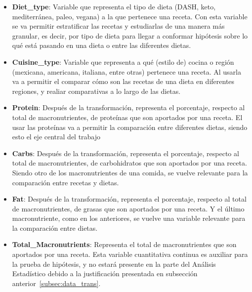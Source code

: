 \documentclass[12pt,a4paper]{article}
\begin{document}
        \begin{itemize}[label=\textbullet]

            \item \textbf{Diet\_type}: Variable que representa el tipo de 
            dieta (DASH, keto, mediterránea, paleo, vegana) a la que 
            pertenece una receta. Con esta variable se va permitir estratificar 
            las recetas y estudiarlas de una manera más granular, es decir, 
            por tipo de dieta para llegar a conformar hipótesis sobre lo qué 
            está pasando en una dieta o entre las diferentes dietas.

            \item \textbf{Cuisine\_type}: Variable que representa a qué (estilo 
            de) cocina o región (mexicana, americana, italiana, entre otras) pertenece una 
            receta. Al usarla va a permitir el comparar cómo son las recetas 
            de una dieta en diferentes regiones, y realiar comparativas a lo 
            largo de las dietas.

            \item \textbf{Protein}: Después de la transformación, representa el 
            porcentaje, respecto al total de macronutrientes, de proteínas que son 
            aportados por una receta. El usar las proteínas va a permitir la 
            comparación entre diferentes dietas, siendo esto el eje central del trabajo

            \item \textbf{Carbs}: Después de la transformación, representa el 
            porcentaje, respecto al total de macronutrientes, de carbohidratos que 
            son aportados por una receta. Siendo otro de los macronutrientes de una 
            comida, se vuelve relevante para la comparación entre recetas y dietas.

            \item \textbf{Fat}: Después de la transformación, representa el 
            porcentaje, respecto al total de macronutrientes, de grasas que son 
            aportados por una receta. Y el último macronutriente, como en los 
            anteriores, se vuelve una variable relevante para la comparación entre dietas.

            \item \textbf{Total\_Macronutrients}: Representa el total de 
            macronutrientes que son aportados por una receta. Esta variable 
            cuantitativa continua es auxiliar para la prueba de hipótesis, y 
            no estará presente en la parte del Análisis Estadístico debido 
            a la justificación presentada en subsección anterior~\ref{subsec:data_trans}.

        \end{itemize}
\end{document}
